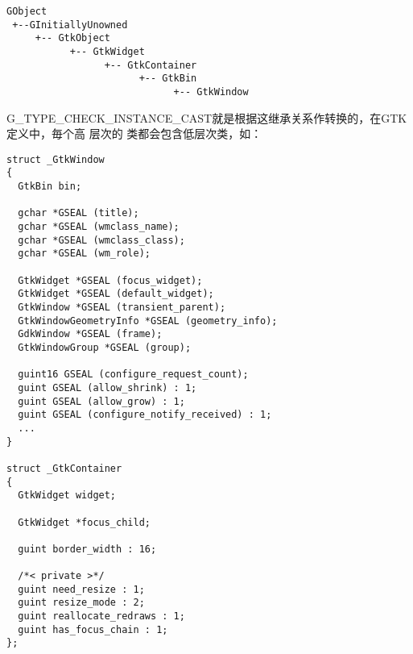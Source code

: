 \begin{shell}
\begin{verbatim}
GObject                                                                       
 +--GInitiallyUnowned                                                         
     +-- GtkObject                                                            
           +-- GtkWidget                                                      
                 +-- GtkContainer                                             
                       +-- GtkBin                                             
                             +-- GtkWindow  
\end{verbatim}
\end{shell}

G\_TYPE\_CHECK\_INSTANCE\_CAST就是根据这继承关系作转换的，在GTK定义中，毎个高 层次的
类都会包含低层次类，如：

\begin{shell}
\begin{verbatim}
struct _GtkWindow
{
  GtkBin bin;

  gchar *GSEAL (title);
  gchar *GSEAL (wmclass_name);
  gchar *GSEAL (wmclass_class);
  gchar *GSEAL (wm_role);

  GtkWidget *GSEAL (focus_widget);
  GtkWidget *GSEAL (default_widget);
  GtkWindow *GSEAL (transient_parent);
  GtkWindowGeometryInfo *GSEAL (geometry_info);
  GdkWindow *GSEAL (frame);
  GtkWindowGroup *GSEAL (group);

  guint16 GSEAL (configure_request_count);
  guint GSEAL (allow_shrink) : 1;
  guint GSEAL (allow_grow) : 1;
  guint GSEAL (configure_notify_received) : 1;
  ...
}

struct _GtkContainer                                                          
{                                                                             
  GtkWidget widget;                                                           

  GtkWidget *focus_child;                                                     

  guint border_width : 16;                                                    

  /*< private >*/                                                             
  guint need_resize : 1;                                                      
  guint resize_mode : 2;                                                      
  guint reallocate_redraws : 1;                                               
  guint has_focus_chain : 1;                                                  
}; 
\end{verbatim}
\end{shell}

